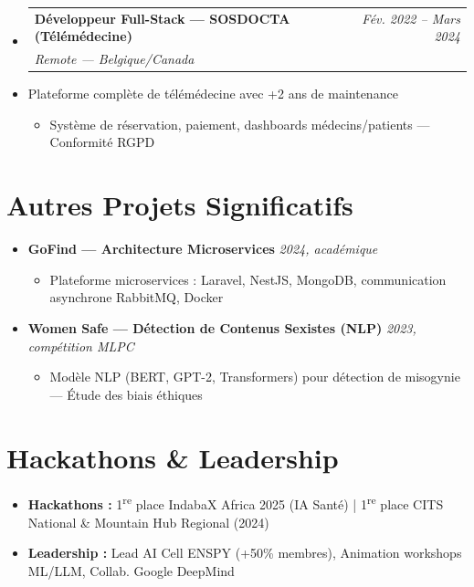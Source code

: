 \documentclass[a4paper,11pt]{article}
\makeatletter
\newcommand{\resumeItem}[1]{\item\small{#1}}
\newcommand{\resumeSubheading}[4]{
\vspace{-1pt}\item
\begin{tabular*}{0.97\textwidth}[t]{l@{\extracolsep{\fill}}r}
\textbf{#1} & \textit{\small #2} \\
\textit{\small #3} & \textit{\small #4} \\
\end{tabular*}\vspace{-5pt}
}
\makeatother
\begin{document}
\begin{itemize}[leftmargin=*, label={}]
    \resumeSubheading
      {Développeur Full-Stack — SOSDOCTA (Télémédecine)}{Fév. 2022 -- Mars 2024}
      {Remote — Belgique/Canada}{}
      \resumeItem{Plateforme complète de télémédecine avec +2 ans de maintenance}
      \begin{itemize}[leftmargin=0.4cm, nosep, label=\tiny$\bullet$]
        \item \small{Système de réservation, paiement, dashboards médecins/patients — Conformité RGPD}
      \end{itemize}

\end{itemize}

\section{Autres Projets Significatifs}
\begin{itemize}[leftmargin=*, label={}]

    \item \textbf{GoFind — Architecture Microservices} \hfill \textit{2024, académique}
    \vspace{-2pt}
    \begin{itemize}[leftmargin=0.4cm, nosep, label=\tiny$\bullet$]
        \item \small{Plateforme microservices : Laravel, NestJS, MongoDB, communication asynchrone RabbitMQ, Docker}
    \end{itemize}
    \vspace{2pt}

    \item \textbf{Women Safe — Détection de Contenus Sexistes (NLP)} \hfill \textit{2023, compétition MLPC}
    \vspace{-2pt}
    \begin{itemize}[leftmargin=0.4cm, nosep, label=\tiny$\bullet$]
        \item \small{Modèle NLP (BERT, GPT-2, Transformers) pour détection de misogynie — Étude des biais éthiques}
    \end{itemize}

\end{itemize}

\section{Hackathons \& Leadership}
\begin{itemize}[leftmargin=*, nosep]
\item \small{\textbf{Hackathons :} 1\textsuperscript{re} place IndabaX Africa 2025 (IA Santé) | 1\textsuperscript{re} place CITS National \& Mountain Hub Regional (2024)}
\item \small{\textbf{Leadership :} Lead AI Cell ENSPY (+50\% membres), Animation workshops ML/LLM, Collab. Google DeepMind}
\end{itemize}
\end{document}
